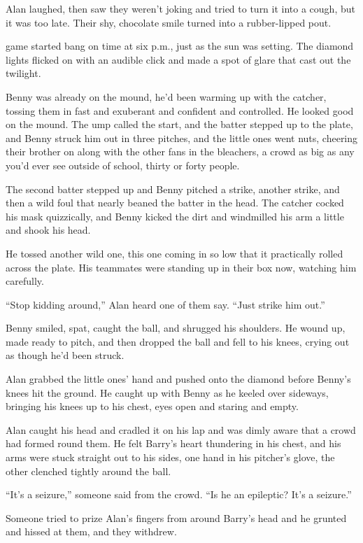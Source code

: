 Alan laughed, then saw they weren't joking and tried to turn it into a
cough, but it was too late.  Their shy, chocolate smile turned into a
rubber-lipped pout.

 game started bang on time at six p.m., just as the sun was
setting.  The diamond lights flicked on with an audible click and made
a spot of glare that cast out the twilight.

Benny was already on the mound, he'd been warming up with the catcher,
tossing them in fast and exuberant and confident and controlled.  He
looked good on the mound.  The ump called the start, and the batter
stepped up to the plate, and Benny struck him out in three pitches,
and the little ones went nuts, cheering their brother on along with
the other fans in the bleachers, a crowd as big as any you'd ever see
outside of school, thirty or forty people.

The second batter stepped up and Benny pitched a strike, another
strike, and then a wild foul that nearly beaned the batter in the
head.  The catcher cocked his mask quizzically, and Benny kicked the
dirt and windmilled his arm a little and shook his head.

He tossed another wild one, this one coming in so low that it
practically rolled across the plate.  His teammates were standing up
in their box now, watching him carefully.

``Stop kidding around,'' Alan heard one of them say.  ``Just strike
him out.''

Benny smiled, spat, caught the ball, and shrugged his shoulders.  He
wound up, made ready to pitch, and then dropped the ball and fell to
his knees, crying out as though he'd been struck.

Alan grabbed the little ones' hand and pushed onto the diamond before
Benny's knees hit the ground.  He caught up with Benny as he keeled
over sideways, bringing his knees up to his chest, eyes open and
staring and empty.

Alan caught his head and cradled it on his lap and was dimly aware
that a crowd had formed round them.  He felt Barry's heart thundering
in his chest, and his arms were stuck straight out to his sides, one
hand in his pitcher's glove, the other clenched tightly around the
ball.

``It's a seizure,'' someone said from the crowd.  ``Is he an
epileptic?  It's a seizure.''

Someone tried to prize Alan's fingers from around Barry's head and he
grunted and hissed at them, and they withdrew.

